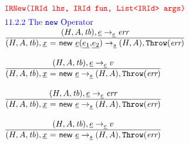 \[\begin{array}{l@{~~}l@{~~}ll}
\mtt{\normalsize\inred IRNew(IRId lhs, IRId fun, List<IRId> args)}\\[.5em]
\mbox{\inblue 11.2.2 The {\tt new} Operator}\\
\frac{\begin{matrix}
\evale, \ir{\expr} \rightarrow_{\ir\expr} \err
\end{matrix}}{\begin{matrix}
\state, \irnew{\tt(}\ir{\expr_1}{\tt,}\ir{\expr_2}{\tt)} \rightarrow_{\ir\stmt} \res, \error
\end{matrix}}
\\\\

\frac{\begin{matrix}
\evale, \ir{\expr} \rightarrow_{\ir\expr} v
\end{matrix}}{\begin{matrix}
\state, \irnew \rightarrow_{\ir\stmt} \res, \error
\end{matrix}}
\\\\

\frac{\begin{matrix}
\evale, \ir{\expr} \rightarrow_{\ir\expr} \err
\end{matrix}}{\begin{matrix}
\state, \irnew \rightarrow_{\ir\stmt} \res, \error
\end{matrix}}
\\\\

\frac{\begin{matrix}
\evale, \ir{\expr} \rightarrow_{\ir\expr} v
\end{matrix}}{\begin{matrix}
\state, \irnew \rightarrow_{\ir\stmt} \res, \error
\end{matrix}}
\\\\


\end{array}
\]




